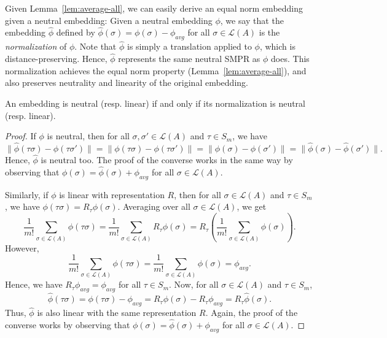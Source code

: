 \documentclass[prodmode,acmec]{ec-acmsmall}
\newcommand{\calL}{{\mathcal{L}}}
\newcommand{\rank}{{\calL(A)}}
\begin{document}
Given Lemma~\ref{lem:average-all}, we can easily derive an equal norm embedding given a neutral embedding: Given a neutral embedding $\phi$, we say that the embedding $\hat{\phi}$ defined by $\hat{\phi}(\sigma) = \phi(\sigma) - \phi_{avg}$ for all $\sigma \in \rank$ is the \emph{normalization} of $\phi$. Note that $\hat{\phi}$ is simply a translation applied to $\phi$, which is distance-preserving. Hence, $\hat{\phi}$ represents the same neutral SMPR as $\phi$ does. This normalization achieves the equal norm property (Lemma~\ref{lem:average-all}), and also preserves neutrality and linearity of the original embedding. 


\begin{lemma}
An embedding is neutral (resp. linear) if and only if its normalization is neutral (resp. linear). 
\label{lem:preservation}
\end{lemma}
\begin{proof}
If $\phi$ is neutral, then for all $\sigma,\sigma' \in \rank$ and $\tau \in S_m$, we have 
$$
\|\hat{\phi}(\tau \sigma)-\hat{\phi}(\tau \sigma')\| = \|\phi(\tau \sigma)-\phi(\tau \sigma')\| = \|\phi(\sigma)-\phi(\sigma')\| = \|\hat{\phi}(\sigma)-\hat{\phi}(\sigma')\|.
$$
Hence, $\hat{\phi}$ is neutral too. The proof of the converse works in the same way by observing that $\phi(\sigma) = \hat{\phi}(\sigma)+\phi_{avg}$ for all $\sigma \in \rank$. 

Similarly, if $\phi$ is linear with representation $R$, then for all $\sigma \in \rank$ and $\tau \in S_m$, we have $\phi(\tau \sigma) = R_{\tau}\phi(\sigma)$. Averaging over all $\sigma \in \rank$, we get 
$$
\frac{1}{m!} \sum_{\sigma \in \rank} \phi(\tau \sigma) = \frac{1}{m!}  \sum_{\sigma \in \rank} R_{\tau} \phi(\sigma) = R_{\tau} \left (\frac{1}{m!}  \sum_{\sigma \in \rank} \phi(\sigma) \right).
$$
However, 
$$
\frac{1}{m!}  \sum_{\sigma \in \rank} \phi(\tau \sigma) = \frac{1}{m!}  \sum_{\sigma \in \rank} \phi(\sigma) = \phi_{avg}.
$$
Hence, we have $R_{\tau}\phi_{avg} = \phi_{avg}$ for all $\tau \in S_m$. Now, for all $\sigma \in \rank$ and $\tau \in S_m$, 
$$
\hat{\phi}(\tau \sigma) = \phi(\tau \sigma) - \phi_{avg} = R_{\tau}\phi(\sigma) - R_{\tau}\phi_{avg} = R_{\tau}\hat{\phi}(\sigma).
$$
Thus, $\hat{\phi}$ is also linear with the same representation $R$. Again, the proof of the converse works by observing that $\phi(\sigma) = \hat{\phi}(\sigma)+\phi_{avg}$ for all $\sigma \in \rank$. 
\end{proof}
\end{document}
